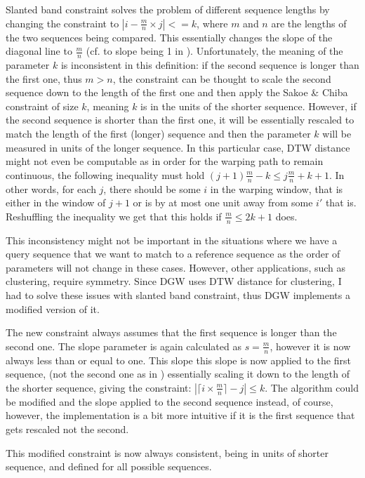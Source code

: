 \documentclass[parskip]{cs4rep}
\begin{document}
Slanted band constraint solves the problem of different sequence lengths by changing the constraint to 
$|i - \frac{m}{n} \times j| <= k$, where $m$ and $n$ are the lengths of the two sequences being compared. This essentially changes the slope of the diagonal line to $\frac{m}{n}$ (cf. to slope being 1 in \citep{Sakoe:1978ta}). Unfortunately, the meaning of the parameter $k$ is inconsistent in this definition: if the second sequence is longer than the first one, thus $m > n$, the constraint can be thought to scale the second sequence down to the length of the first one and then apply the Sakoe \& Chiba constraint of size $k$, meaning $k$ is in the units of the shorter sequence. However, if the second sequence is shorter than the first one, it will be essentially rescaled to match the length of the first (longer) sequence and then the parameter $k$ will be measured in units of the longer sequence. In this particular case, DTW distance might not even be computable as in order for the warping path to remain continuous, the following inequality must hold $(j+1) \frac{m}{n} - k \le j \frac{m}{n} + k + 1$. In other words, for each $j$, there should be some $i$ in the warping window, that is either in the window of $j+1$ or is by at most one unit away from some $i'$ that is. Reshuffling the inequality we get that this holds if $\frac{m}{n} \le 2k + 1$ does.

This inconsistency might not be important in the situations where we have a query sequence that we want to match to a reference sequence as the order of parameters will not change in these cases. However, other applications, such as clustering, require symmetry. Since DGW uses DTW distance for clustering, I had to solve these issues with slanted band constraint, thus
DGW implements a modified version of it. 

The new constraint always assumes that the first sequence is longer than the second one. The slope parameter is again calculated as $s = \frac{m}{n}$, however it is now always less than or equal to one. This slope this slope is now applied to the first sequence, (not the second one as in \citep{Giorgino:2009ue}) essentially scaling it down to the length of the shorter sequence, giving the constraint: $|\lceil i \times \frac{m}{n} \rceil - j| \le k$. The algorithm could be modified and the slope applied to the second sequence instead, of course, however, the implementation is a bit more intuitive if it is the first sequence that gets rescaled not the second. 

This modified constraint is now always consistent, being in units of shorter sequence, and defined for all possible sequences.
\end{document}

